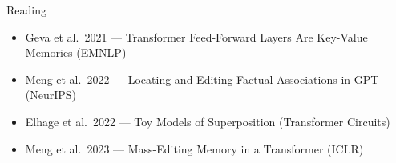 \documentclass[aspectratio=169,11pt]{beamer}
\begin{document}
\begin{frame}{Reading}
\begin{itemize}
\item Geva et al.\ 2021 --- Transformer Feed-Forward Layers Are Key-Value Memories (EMNLP)
\item Meng et al.\ 2022 --- Locating and Editing Factual Associations in GPT (NeurIPS)
\item Elhage et al.\ 2022 --- Toy Models of Superposition (Transformer Circuits)
\item Meng et al.\ 2023 --- Mass-Editing Memory in a Transformer (ICLR)
\end{itemize}
\end{frame}
\end{document}
